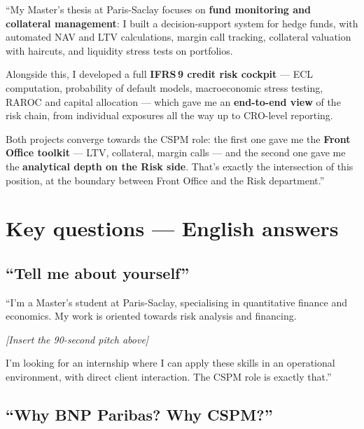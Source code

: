 \documentclass[11pt,a4paper]{article}
\begin{document}
\begin{pitchbox}
``My Master's thesis at Paris-Saclay focuses on \textbf{fund monitoring and
collateral management}: I built a decision-support system for hedge funds,
with automated NAV and LTV calculations, margin call tracking, collateral
valuation with haircuts, and liquidity stress tests on portfolios.

Alongside this, I developed a full \textbf{IFRS\,9 credit risk cockpit} ---
ECL computation, probability of default models, macroeconomic stress testing,
RAROC and capital allocation --- which gave me an \textbf{end-to-end view}
of the risk chain, from individual exposures all the way up to CRO-level
reporting.

Both projects converge towards the CSPM role: the first one gave me the
\textbf{Front Office toolkit} --- LTV, collateral, margin calls --- and the
second one gave me the \textbf{analytical depth on the Risk side}. That's
exactly the intersection of this position, at the boundary between Front
Office and the Risk department.''
\end{pitchbox}

\vspace{8pt}

\section{Key questions --- English answers}

\subsection{``Tell me about yourself''}

\begin{verbatimbox}
``I'm a Master's student at Paris-Saclay, specialising in quantitative
finance and economics. My work is oriented towards risk analysis and
financing.

\textit{[Insert the 90-second pitch above]}

I'm looking for an internship where I can apply these skills in an
operational environment, with direct client interaction. The CSPM role
is exactly that.''
\end{verbatimbox}

\subsection{``Why BNP Paribas? Why CSPM?''}
\end{document}
